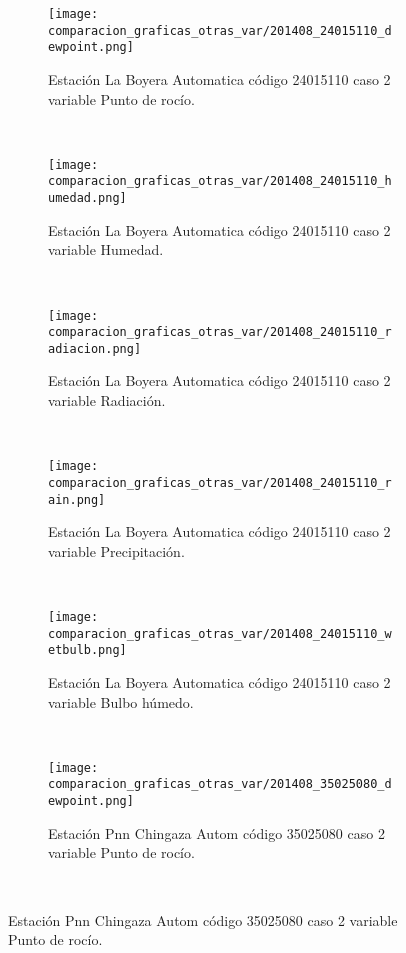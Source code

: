 \begin{figure}[H]
\centering
\begin{subfigure}[normla]{0.4\textwidth}
\caption{Estación La Boyera Automatica código 24015110 caso 2 variable Punto de rocío.}
\texttt{[image: comparacion\_graficas\_otras\_var/201408\_24015110\_dewpoint.png]}
\end{subfigure}
~
\begin{subfigure}[normla]{0.4\textwidth}
\caption{Estación La Boyera Automatica código 24015110 caso 2 variable Humedad.}
\texttt{[image: comparacion\_graficas\_otras\_var/201408\_24015110\_humedad.png]}
\end{subfigure}
~
\begin{subfigure}[normla]{0.4\textwidth}
\caption{Estación La Boyera Automatica código 24015110 caso 2 variable Radiación.}
\texttt{[image: comparacion\_graficas\_otras\_var/201408\_24015110\_radiacion.png]}
\end{subfigure}
~
\begin{subfigure}[normla]{0.4\textwidth}
\caption{Estación La Boyera Automatica código 24015110 caso 2 variable Precipitación.}
\texttt{[image: comparacion\_graficas\_otras\_var/201408\_24015110\_rain.png]}
\end{subfigure}
~
\begin{subfigure}[normla]{0.4\textwidth}
\caption{Estación La Boyera Automatica código 24015110 caso 2 variable Bulbo húmedo.}
\texttt{[image: comparacion\_graficas\_otras\_var/201408\_24015110\_wetbulb.png]}
\end{subfigure}
~
\begin{subfigure}[normla]{0.4\textwidth}
\caption{Estación Pnn Chingaza Autom  código 35025080 caso 2 variable Punto de rocío.}
\texttt{[image: comparacion\_graficas\_otras\_var/201408\_35025080\_dewpoint.png]}
\end{subfigure}
~
\end{figure}
           
